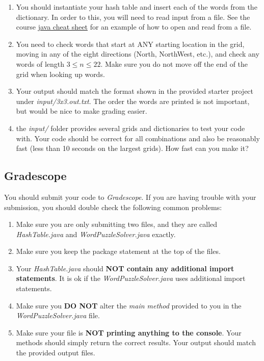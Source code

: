 \documentclass[paper=a4, fontsize=11pt, parskip=full]{scrartcl} %
\numberwithin{equation}{section} %
\numberwithin{figure}{section} %
\numberwithin{table}{section} %
\begin{document}
\begin{enumerate}
	\item You should instantiate your hash table and insert each of the words from the dictionary. In order to this, you will need to read input from a file. See the course \href{https://uva-cs.github.io/dsa1/java/javaCheatSheet/javaCheatSheet.pdf}{java cheat sheet} for an example of how to open and read from a file.
	\item You need to check words that start at ANY starting location in the grid, moving in any of the eight directions (North, NorthWest, etc.), and check any words of length $3 \leq n \leq 22$. Make sure you do not move off the end of the grid when looking up words.
	\item Your output should match the format shown in the provided starter project under \emph{input/3x3.out.txt}. The order the words are printed is not important, but would be nice to make grading easier.
	\item the \emph{input/} folder provides several grids and dictionaries to test your code with. Your code should be correct for all combinations and also be reasonably fast (less than 10 seconds on the largest grids). How fast can you make it?
\end{enumerate}

\subsection{Gradescope}

You should submit your code to \emph{Gradescope}. If you are having trouble with your submission, you should double check the following common problems:

\begin{enumerate}
  \item Make sure you are only submitting two files, and they are called \emph{HashTable.java} and \emph{WordPuzzleSolver.java} exactly.
  \item Make sure you keep the package statement at the top of the files.
  \item Your \emph{HashTable.java} should \textbf{NOT contain any additional import statements}. It is ok if the \emph{WordPuzzleSolver.java} uses additional import statements.
  \item Make sure you \textbf{DO NOT} alter the \emph{main method} provided to you in the \emph{WordPuzzleSolver.java} file.
  \item Make sure your file is \textbf{NOT printing anything to the console}. Your methods should simply return the correct results. Your output should match the provided output files.
\end{enumerate}


\end{document}
